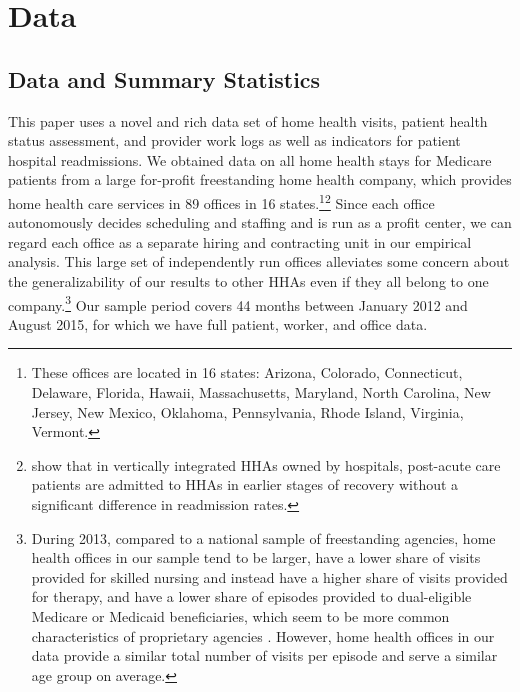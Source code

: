 \documentclass[final,12pt, notitlepage]{article}
\begin{document}
\section{Data} \label{sec:databig}

\subsection{Data and Summary Statistics} \label{sec:data_ch3}
This paper uses a novel and rich data set of home health visits, patient health status assessment, and provider work logs as well as indicators for patient hospital readmissions.
We obtained data on all home health stays for Medicare patients from a large for-profit freestanding home health company, which provides home health care services in 89 offices in 16 states.\footnote{These offices are located in 16 states: Arizona, Colorado, Connecticut, Delaware, Florida, Hawaii, Massachusetts, Maryland, North Carolina, New Jersey, New Mexico, Oklahoma, Pennsylvania, Rhode Island, Virginia, Vermont.
}\footnote{\citet{David2013} show that in vertically integrated HHAs owned by hospitals, post-acute care patients are admitted to HHAs in earlier stages of recovery without a significant difference in readmission rates.
}
Since each office autonomously decides scheduling and staffing and is run as a profit center, we can regard each office as a separate hiring and contracting unit in our empirical analysis.
This large set of independently run offices alleviates some concern about the generalizability of our results to other HHAs even if they all belong to one company.\footnote{During 2013, compared to a national sample of freestanding agencies, home health offices in our sample tend to be larger, have a lower share of visits provided for skilled nursing and instead have a higher share of visits provided for therapy, and have a lower share of episodes provided to dual-eligible Medicare or Medicaid beneficiaries, which seem to be more common characteristics of proprietary agencies \citep{Cabin2014, MedPAC2016hh}.
 However, home health offices in our data provide a similar total number of visits per episode and serve a similar age group on average.
}
Our sample period covers 44 months between January 2012 and August 2015, for which we have full patient, worker, and office data.
\end{document}
